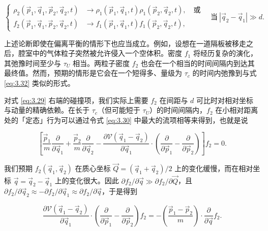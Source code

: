 \begin{equation}\label{eq:3.32}
  \left\{\begin{aligned}
    \rho_2(\vec p_1,\vec q_1,\vec p_2,\vec q_2,t)&\to\rho_1(\vec p_1,\vec q_1,t)\rho_1(\vec p_2,\vec q_2,t),\quad\text{或}\\
    f_2(\vec p_1,\vec q_1,\vec p_2,\vec q_2,t)&\to f_1(\vec p_1,\vec q_1,t)f_1(\vec p_2,\vec q_2,t),
  \end{aligned}\right.
  \quad\text{当}\ |\vec q_2-\vec q_1|\gg d.
\end{equation}

上述论断即使在偏离平衡的情形下也应当成立。例如，设想在一道隔板被移走之后，腔室中的气体粒子突然被允许侵入一个空体积。密度 $f_1$ 将经历复杂的演化，其弛豫时间至少与 $\tau_U$ 相当。两粒子密度 $f_2$ 也会在一个相当的时间间隔内到达其最终值。然而，预期的情形是它会在一个短得多、量级为 $\tau_c$ 的时间内弛豫到与式 \eqref{eq:3.32} 类似的形式。



对式 \eqref{eq:3.29} 右端的碰撞项，我们实际上需要 $f_2$ 在间距与 $d$ 可比时对相对坐标与动量的精确依赖。在长于 $\tau_c$（但可能短于 $\tau_U$）的时间间隔内，$f_2$ 在小相对距离处的「定态」行为可以通过令式 \eqref{eq:3.30} 中最大的流项相等来得到，也就是说

\begin{equation}\label{eq:3.33}
  \left[\frac{\vec p_1}{m}\frac{\partial}{\partial\vec q_1}+\frac{\vec p_2}{m}\frac{\partial}{\partial\vec q_2}-\frac{\partial\mathscr V(\vec q_1-\vec q_2)}{\partial\vec q_1}\cdot\left(\frac{\partial}{\partial\vec p_1}-\frac{\partial}{\partial\vec p_2}\right)\right]f_2=0.
\end{equation}

我们预期 $f_2(\vec q_1,\vec q_2)$ 在质心坐标 $\vec Q=(\vec q_1+\vec q_2)/2$ 上的变化缓慢，而在相对坐标 $\vec q=\vec q_2-\vec q_1$ 上的变化很大。因此 $\partial f_2/\partial\vec q\gg\partial f_2/\partial\vec Q$，且 $\partial f_2/\partial\vec q_2\approx-\partial f_2/\partial\vec q_1\approx\partial f_2/\partial\vec q$，于是得到

\begin{equation}\label{eq:3.34}
  \frac{\partial\mathscr V(\vec q_1-\vec q_2)}{\partial\vec q_1}\cdot\left(\frac{\partial}{\partial\vec p_1}-\frac{\partial}{\partial\vec p_2}\right)f_2=-\left(\frac{\vec p_1-\vec p_2}{m}\right)\cdot\frac{\partial}{\partial\vec q}f_2.
\end{equation}

